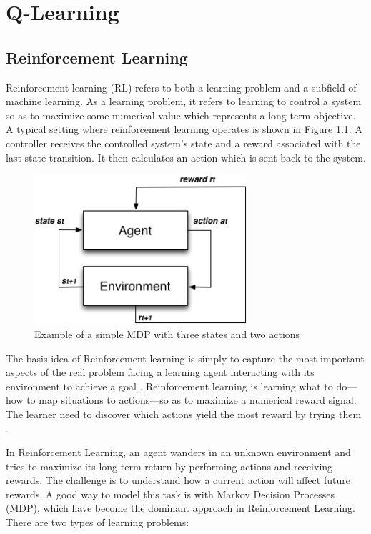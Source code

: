 \chapter{Q-Learning}




\section{Reinforcement Learning}

Reinforcement learning (RL) refers to both a learning problem and a subfield of machine
learning. As a learning problem, it refers to learning to control a system so as to maximize
some numerical value which represents a long-term objective. A typical setting where
reinforcement learning operates is shown in Figure \ref{fig:agentenv}: A controller receives the controlled
system’s state and a reward associated with the last state transition. It then calculates an
action which is sent back to the system.


\begin{figure}
\centering
\includegraphics[width=0.7\textwidth]{./images/agentenv.png}
\caption{Example of a simple MDP with three states and two actions}
\label{fig:agentenv}
\end{figure}


The basis idea of Reinforcement learning  is simply to capture the most important aspects of the real problem facing a learning agent interacting with its environment to achieve a goal \cite{Sutton2012}. Reinforcement learning is learning what to do—how to map situations to actions—so as to maximize a numerical reward signal. The learner need to discover which actions yield the most reward by trying them \cite{Sutton2012}.

In Reinforcement Learning, an agent wanders in an unknown environment and tries to maximize its long term return by performing actions and receiving rewards. The challenge is to understand how a current action will affect future rewards. A good way to model this task is with Markov Decision Processes (MDP), which have become the dominant approach in Reinforcement Learning. There are two types of learning problems:

